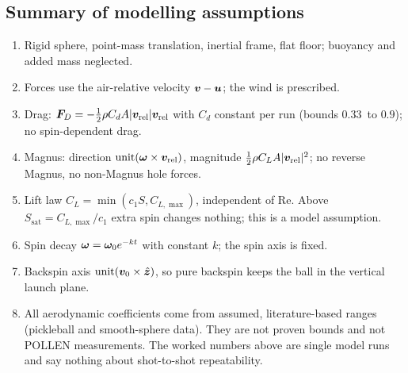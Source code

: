 \subsection{Summary of modelling assumptions}
\label{sec:flight-assumptions}

\begin{enumerate}
  \item Rigid sphere, point-mass translation, inertial frame, flat floor; buoyancy and added mass
    neglected.
  \item Forces use the air-relative velocity $\bm{v}-\bm{u}$; the wind is prescribed.
  \item Drag: $\bm{F}_D = -\tfrac12\rho C_d A|\bm{v}_{\mathrm{rel}}|\bm{v}_{\mathrm{rel}}$
    with $C_d$ constant per run (bounds $0.33$\assumed\ to $0.9$\assumed); no spin-dependent drag.
  \item Magnus: direction $\operatorname{unit}(\bm{\omega}\times\bm{v}_{\mathrm{rel}})$, magnitude
    $\tfrac12\rho C_L A|\bm{v}_{\mathrm{rel}}|^2$; no reverse Magnus, no non-Magnus hole forces.
  \item Lift law $C_L = \min(c_1 S, C_{L,\max})$, independent of $\mathrm{Re}$. Above
    $S_{\mathrm{sat}} = C_{L,\max}/c_1$ extra spin changes nothing; this is a model assumption.
  \item Spin decay $\bm{\omega} = \bm{\omega}_0 e^{-kt}$ with constant $k$; the spin axis is fixed.
  \item Backspin axis $\operatorname{unit}(\bm{v}_0\times\hat{\bm{z}})$, so pure backspin keeps the
    ball in the vertical launch plane.
  \item All aerodynamic coefficients come from assumed, literature-based ranges (pickleball and
    smooth-sphere data). They are not proven bounds and not POLLEN measurements. The worked numbers
    above are single model runs and say nothing about shot-to-shot repeatability.
\end{enumerate}
